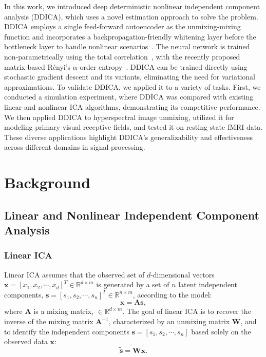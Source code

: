 \documentclass{article}
\begin{document}
In this work, we introduced deep deterministic nonlinear independent component analysis (DDICA), which uses a novel estimation approach to solve the problem. DDICA employs a single feed-forward autoencoder as the unmixing-mixing function and incorporates a backpropagation-friendly whitening layer before the bottleneck layer to handle nonlinear scenarios~\cite{Li2022DeepDI}. The neural network is trained non-parametrically using the total correlation~\cite{watanabe1960information}, with the recently proposed matrix-based Rényi's $\alpha$-order entropy~\cite{Giraldo2014,Yu2019,Dong23}. DDICA can be trained directly using stochastic gradient descent and its variants, eliminating the need for variational approximations. To validate DDICA, we applied it to a variety of tasks. First, we conducted a simulation experiment, where DDICA was compared with existing linear and nonlinear ICA algorithms, demonstrating its competitive performance. We then applied DDICA to hyperspectral image unmixing, utilized it for modeling primary visual receptive fields, and tested it on resting-state fMRI data. These diverse applications highlight DDICA’s generalizability and effectiveness across different domains in signal processing.

\section{Background}
\subsection{Linear and Nonlinear Independent Component Analysis}
\subsubsection{Linear ICA} 
\hspace{1.2em} Linear ICA assumes that the observed set of  \(d\)-dimensional vectors \(\mathbf{x} = [x_1, x_2, \cdots, x_d] ^T\in \mathbb{R}^{d \times m}\) is generated by a set of \(n\) latent independent components, \(\mathbf{s} = [s_1, s_2, \cdots, s_n]^T\in \mathbb{R}^{n \times m}\), according to the model:
\[
\mathbf{x} = \mathbf{A}\mathbf{s},
\]
where \(\mathbf{A}\) is a mixing matrix, \( \in\mathbb{R}^{d \times m}\). The goal of linear ICA is to recover the inverse of the mixing matrix \(\mathbf{A}^{-1}\), characterized by an unmixing matrix \(\mathbf{W}\), and to identify the independent components \(\mathbf{s} = [s_1, s_2, \cdots, s_n]\) based solely on the observed data \(\mathbf{x}\):
\[
\mathbf{\tilde{s}} = \mathbf{W}\mathbf{x}.
\]
\end{document}
